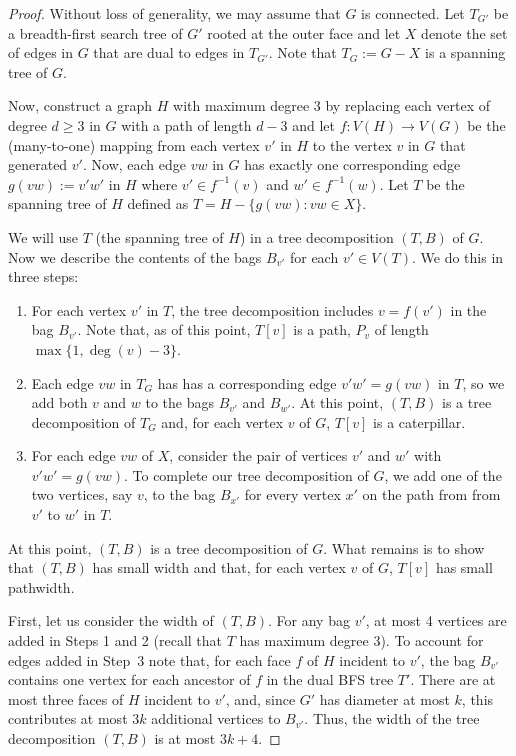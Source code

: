 \documentclass{patmorin}
\begin{document}
\begin{proof}
  Without loss of generality, we may assume that $G$ is connected.
  Let $T_{G'}$ be a breadth-first search tree of $G'$ rooted at the
  outer face and let $X$ denote the set of edges in $G$ that are dual
  to edges in $T_{G'}$. Note that $T_G:=G-X$ is a spanning tree of $G$.

  Now, construct a graph $H$ with maximum degree 3 by replacing each
  vertex of degree $d\ge 3$ in $G$ with a path of length $d-3$ and let
  $f:V(H)\to V(G)$ be the (many-to-one) mapping from each vertex $v'$
  in $H$ to the vertex $v$ in $G$ that generated $v'$. Now, each
  edge $vw$ in $G$ has exactly one corresponding edge $g(vw):=v'w'$
  in $H$ where $v'\in f^{-1}(v)$ and $w'\in f^{-1}(w)$.  Let $T$ be the
  spanning tree of $H$ defined as $T=H-\{g(vw):vw\in X\}$.

  We will use $T$ (the spanning tree of $H$) in a tree decomposition
  $(T,B)$ of $G$.  Now we describe the contents of the bags $B_{v'}$ for
  each $v'\in V(T)$.  We do this in three steps:

  \begin{enumerate}
    \item For each vertex $v'$ in $T$, the tree decomposition
  includes $v=f(v')$ in the bag $B_{v'}$.  Note that, as of this point, 
  $T[v]$ is a path, $P_v$ of length $\max\{1,\deg(v)-3\}$. 

    \item Each edge $vw$ in $T_G$ has has a corresponding edge $v'w'=g(vw)$
  in $T$, so we add both $v$ and $w$ to the bags $B_{v'}$ and $B_{w'}$.
  At this point, $(T,B)$ is a tree decomposition of $T_G$ and, for each
  vertex $v$ of $G$,  $T[v]$ is a caterpillar.  

    \item For each edge $vw$
  of $X$, consider the pair of vertices $v'$ and $w'$ with $v'w'=g(vw)$.
  To complete our tree decomposition of $G$, we add one of the two
  vertices, say $v$, to the bag $B_{x'}$ for every vertex $x'$ on the
  path from from $v'$ to $w'$ in $T$.
  \end{enumerate}
  At this point, $(T,B)$ is a tree decomposition of $G$. What remains
  is to show that $(T,B)$ has small width and that, for each vertex $v$
  of $G$, $T[v]$ has small pathwidth.

  First, let us consider the width of $(T,B)$.  For any bag $v'$, at most
  4 vertices are added in Steps 1 and 2 (recall that $T$ has maximum
  degree 3).  To account for edges added in Step~3 note that, for each
  face $f$ of $H$ incident to $v'$, the bag $B_{v'}$ contains one vertex
  for each ancestor of $f$ in the dual BFS tree $T'$.  There are at most
  three faces of $H$ incident to $v'$, and, since $G'$ has diameter at
  most $k$, this contributes at most $3k$ additional vertices to $B_{v'}$.
  Thus, the width of the tree decomposition $(T,B)$ is at most $3k+4$.


\end{proof}
\end{document}
